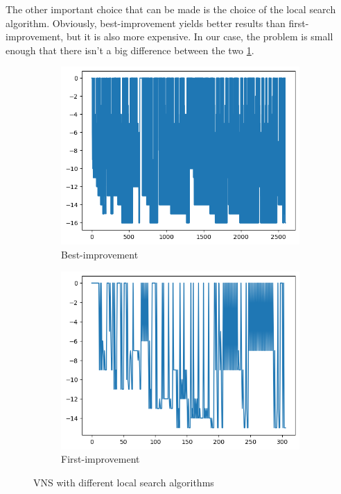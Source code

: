 The other important choice that can be made is the choice of the local search algorithm. Obviously, best-improvement yields better results than first-improvement, but it is also more expensive. In our case, the problem is small enough that there isn't a big difference between the two \ref{fig:vns}.
\begin{figure}[H]
    \begin{subfigure}{0.5\textwidth}
        \includegraphics[width=\textwidth]{lab4/imgs/vns_best.png}
        \caption{Best-improvement}
    \end{subfigure}
    \begin{subfigure}{0.5\textwidth}
        \includegraphics[width=\textwidth]{lab4/imgs/vns_first.png}
        \caption{First-improvement}
    \end{subfigure}
    \caption{VNS with different local search algorithms}
    \label{fig:vns}
\end{figure}


